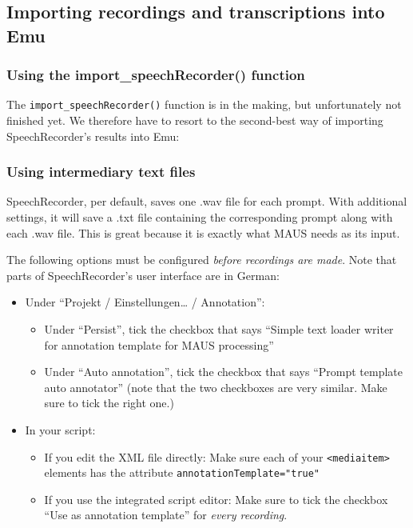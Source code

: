 \documentclass[]{book}
\providecommand{\tightlist}{%
  \setlength{\itemsep}{0pt}\setlength{\parskip}{0pt}}
\theoremstyle{definition}
\theoremstyle{definition}
\theoremstyle{definition}
\theoremstyle{remark}
\begin{document}
\subsection{Importing recordings and transcriptions into
Emu}\label{importing-recordings-and-transcriptions-into-emu}

\subsubsection{Using the import\_speechRecorder()
function}\label{using-the-import_speechrecorder-function}

The \texttt{import\_speechRecorder()} function is in the making, but
unfortunately not finished yet. We therefore have to resort to the
second-best way of importing SpeechRecorder's results into Emu:

\subsubsection{Using intermediary text
files}\label{using-intermediary-text-files}

SpeechRecorder, per default, saves one .wav file for each prompt. With
additional settings, it will save a .txt file containing the
corresponding prompt along with each .wav file. This is great because it
is exactly what MAUS needs as its input.

The following options must be configured \emph{before recordings are
made}. Note that parts of SpeechRecorder's user interface are in German:

\begin{itemize}
\tightlist
\item
  Under ``Projekt / Einstellungen\ldots{} / Annotation'':

  \begin{itemize}
  \tightlist
  \item
    Under ``Persist'', tick the checkbox that says ``Simple text loader
    writer for annotation template for MAUS processing''
  \item
    Under ``Auto annotation'', tick the checkbox that says ``Prompt
    template auto annotator'' (note that the two checkboxes are very
    similar. Make sure to tick the right one.)
  \end{itemize}
\item
  In your script:

  \begin{itemize}
  \tightlist
  \item
    If you edit the XML file directly: Make sure each of your
    \texttt{\textless{}mediaitem\textgreater{}} elements has the
    attribute \texttt{annotationTemplate="true"}
  \item
    If you use the integrated script editor: Make sure to tick the
    checkbox ``Use as annotation template'' for \emph{every recording}.
  \end{itemize}
\end{itemize}
\end{document}

